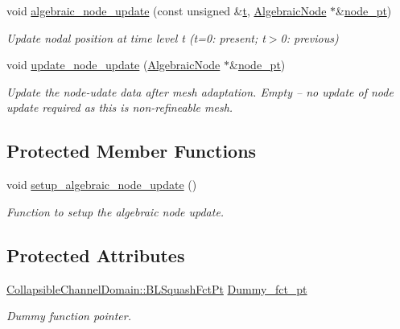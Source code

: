 \begin{DoxyCompactItemize}
void \hyperlink{classoomph_1_1AlgebraicCollapsibleChannelMesh_ae1ea6d9baa12e2ca87d21d4370f41870}{algebraic\+\_\+node\+\_\+update} (const unsigned \&\hyperlink{cfortran_8h_af6f0bd3dc13317f895c91323c25c2b8f}{t}, \hyperlink{classoomph_1_1AlgebraicNode}{Algebraic\+Node} $\ast$\&\hyperlink{classoomph_1_1AlgebraicMesh_aedeebbe95d2f8e67e9939cecd1be3933}{node\+\_\+pt})
\begin{DoxyCompactList}\small\item\em Update nodal position at time level t (t=0\+: present; t$>$0\+: previous) \end{DoxyCompactList}\item 
void \hyperlink{classoomph_1_1AlgebraicCollapsibleChannelMesh_abad38fb50d067a126af1161a3a603972}{update\+\_\+node\+\_\+update} (\hyperlink{classoomph_1_1AlgebraicNode}{Algebraic\+Node} $\ast$\&\hyperlink{classoomph_1_1AlgebraicMesh_aedeebbe95d2f8e67e9939cecd1be3933}{node\+\_\+pt})
\begin{DoxyCompactList}\small\item\em Update the node-\/udate data after mesh adaptation. Empty -- no update of node update required as this is non-\/refineable mesh. \end{DoxyCompactList}\end{DoxyCompactItemize}
\subsection*{Protected Member Functions}
\begin{DoxyCompactItemize}
\item 
void \hyperlink{classoomph_1_1AlgebraicCollapsibleChannelMesh_a54e93316a561cd77a68c0774d2772030}{setup\+\_\+algebraic\+\_\+node\+\_\+update} ()
\begin{DoxyCompactList}\small\item\em Function to setup the algebraic node update. \end{DoxyCompactList}\end{DoxyCompactItemize}
\subsection*{Protected Attributes}
\begin{DoxyCompactItemize}
\item 
\hyperlink{classoomph_1_1CollapsibleChannelDomain_a2bf1d7943bfac134a5c27a54c7e1faed}{Collapsible\+Channel\+Domain\+::\+B\+L\+Squash\+Fct\+Pt} \hyperlink{classoomph_1_1AlgebraicCollapsibleChannelMesh_ab3848ae5c357f45addf4bcfeca1a9d18}{Dummy\+\_\+fct\+\_\+pt}
\begin{DoxyCompactList}\small\item\em Dummy function pointer. \end{DoxyCompactList}\end{DoxyCompactItemize}
